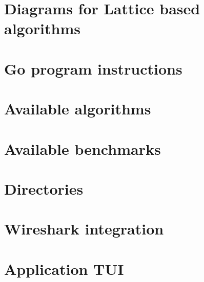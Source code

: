 \chapter{Diagrams for Lattice based algorithms}
\label{ch:block_diagrams}


\chapter{Go program instructions}
\label{ch:go_instructions}


\chapter{Available algorithms}
\label{ch:available_algs}


\chapter{Available benchmarks}
\label{ch:available_benchs}


\chapter{Directories}
\label{ch:directories_app}


\chapter{Wireshark integration}
\label{ch:wireshark}


\chapter{Application TUI}
\label{ch:TUI_example}

